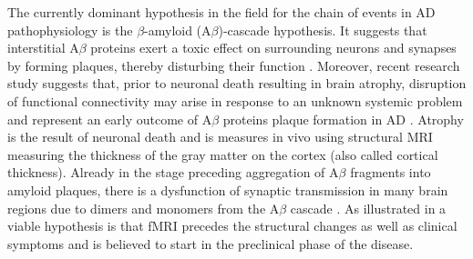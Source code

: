 The currently dominant hypothesis in the field for the chain of events in AD pathophysiology is the $\beta$-amyloid (A$\beta$)-cascade hypothesis. It suggests that interstitial A$\beta$ proteins exert a toxic effect on surrounding neurons and synapses by forming plaques, thereby disturbing their function \citep{Hardy2002,Shankar2008}. Moreover, recent research study suggests that, prior to neuronal death resulting in brain atrophy, disruption of functional connectivity may arise in response to an unknown systemic problem and represent an early outcome of A$\beta$ proteins plaque formation in AD \citep{Sheline2013}. Atrophy is the result of neuronal death and is measures in vivo using structural MRI measuring the thickness of the gray matter on the cortex (also called cortical thickness). Already in the stage preceding aggregation of A$\beta$ fragments into amyloid plaques, there is a dysfunction of synaptic transmission in many brain regions due to dimers and monomers from the A$\beta$ cascade \citep{
dAmelio2012}. As illustrated in \cite{Sperling2011} a viable hypothesis is that fMRI precedes the structural changes as well as clinical symptoms and is believed to start in the preclinical phase of the disease.


